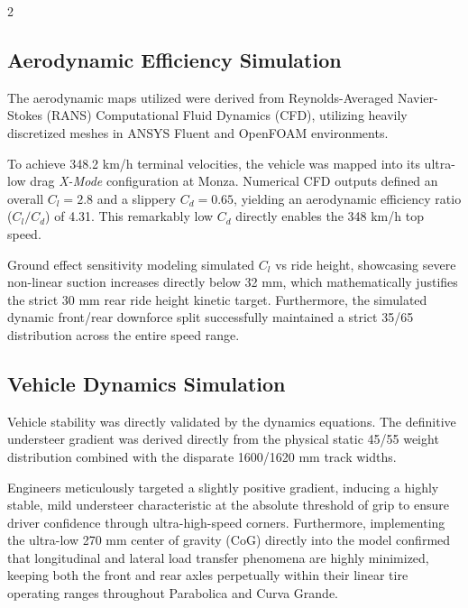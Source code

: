 \begin{multicols}{2}
\subsection{Aerodynamic Efficiency Simulation}

The aerodynamic maps utilized were derived from Reynolds-Averaged Navier-Stokes (RANS) Computational Fluid Dynamics (CFD), utilizing heavily discretized meshes in ANSYS Fluent and OpenFOAM environments.

To achieve 348.2 km/h terminal velocities, the vehicle was mapped into its ultra-low drag \textit{X-Mode} configuration at Monza. Numerical CFD outputs defined an overall $C_{l} = 2.8$ and a slippery $C_{d} = 0.65$, yielding an aerodynamic efficiency ratio ($C_l/C_d$) of 4.31. This remarkably low $C_d$ directly enables the 348 km/h top speed.

Ground effect sensitivity modeling simulated $C_l$ vs ride height, showcasing severe non-linear suction increases directly below 32 mm, which mathematically justifies the strict 30 mm rear ride height kinetic target. Furthermore, the simulated dynamic front/rear downforce split successfully maintained a strict 35/65 distribution across the entire speed range.

\subsection{Vehicle Dynamics Simulation}

Vehicle stability was directly validated by the dynamics equations. The definitive understeer gradient was derived directly from the physical static 45/55 weight distribution combined with the disparate 1600/1620 mm track widths.

Engineers meticulously targeted a slightly positive gradient, inducing a highly stable, mild understeer characteristic at the absolute threshold of grip to ensure driver confidence through ultra-high-speed corners. Furthermore, implementing the ultra-low 270 mm center of gravity (CoG) directly into the model confirmed that longitudinal and lateral load transfer phenomena are highly minimized, keeping both the front and rear axles perpetually within their linear tire operating ranges throughout Parabolica and Curva Grande.
\end{multicols}

